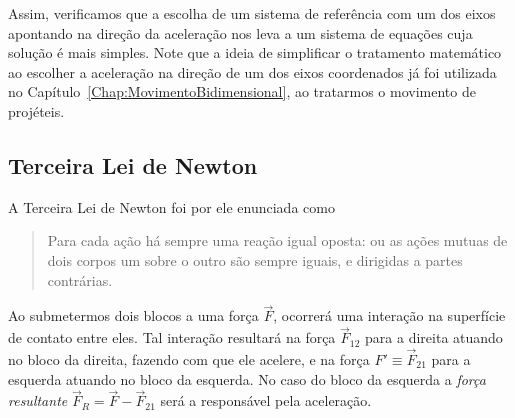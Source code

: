 Assim, verificamos que a escolha de um sistema de referência com um dos eixos apontando na direção da aceleração nos leva a um sistema de equações cuja solução é mais simples. Note que a ideia de simplificar o tratamento matemático ao escolher a aceleração na direção de um dos eixos coordenados já foi utilizada no Capítulo~\ref{Chap:MovimentoBidimensional}, ao tratarmos o movimento de projéteis.





\subsection{Terceira Lei de Newton}

A Terceira Lei de Newton foi por ele enunciada como
\begin{quote}
    Para cada ação há sempre uma reação igual oposta: ou as ações mutuas de dois corpos um sobre o outro são sempre iguais, e dirigidas a partes contrárias.
\end{quote}

\begin{marginfigure}
\centering
{}
\caption{Ao submetermos dois blocos a uma força $\vec{F}$, ocorrerá uma interação na superfície de contato entre eles. Tal interação resultará na força $\vec{F}_{12}$ para a direita atuando no bloco da direita, fazendo com que ele acelere, e na força $F' \equiv \vec{F}_{21}$ para a esquerda atuando no bloco da esquerda. No caso do bloco da esquerda a \emph{força resultante} $\vec{F}_R = \vec{F} - \vec{F}_{21}$ será a responsável pela aceleração.\label{Fig:ParAcaoReacao}}
\end{marginfigure}

